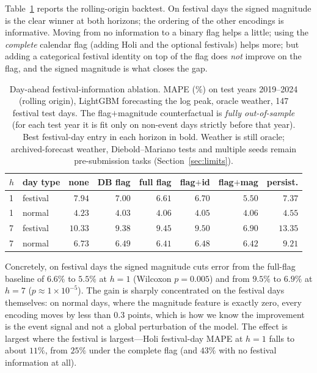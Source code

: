 \documentclass[11pt]{article}
\newcommand{\pct}{\%}
\begin{document}
Table~\ref{tab:ablation} reports the rolling-origin backtest. On festival days the
signed magnitude is the clear winner at both horizons; the ordering of the other
encodings is informative. Moving from no information to a binary flag helps a
little; using the \emph{complete} calendar flag (adding Holi and the optional
festivals) helps more; but adding a categorical festival identity on top of the
flag does \emph{not} improve on the flag, and the signed magnitude is what closes
the gap.

\begin{table}[t]
\centering
\caption{Day-ahead festival-information ablation. MAPE ($\pct$) on test years
2019--2024 (rolling origin), LightGBM forecasting the log peak, oracle weather,
147 festival test days. The flag$+$magnitude counterfactual is \emph{fully
out-of-sample} (for each test year it is fit only on non-event days strictly
before that year). Best festival-day entry in each horizon in bold. Weather is
still oracle; archived-forecast weather, Diebold--Mariano tests and multiple
seeds remain pre-submission tasks (Section~\ref{sec:limits}).}
\label{tab:ablation}
\begin{tabular}{@{}l l r r r r r r@{}}
\toprule
$h$ & day type & none & DB flag & full flag & flag$+$id & flag$+$mag & persist. \\
\midrule
1 & festival & $7.94$ & $7.00$ & $6.61$ & $6.70$ & $\mathbf{5.50}$ & $7.37$ \\
1 & normal   & $4.23$ & $4.03$ & $4.06$ & $4.05$ & $4.06$          & $4.55$ \\
7 & festival & $10.33$& $9.38$ & $9.45$ & $9.50$ & $\mathbf{6.90}$ & $13.35$ \\
7 & normal   & $6.73$ & $6.49$ & $6.41$ & $6.48$ & $6.42$          & $9.21$ \\
\bottomrule
\end{tabular}
\end{table}

Concretely, on festival days the signed magnitude cuts error from the full-flag
baseline of $6.6\pct$ to $5.5\pct$ at $h=1$ (Wilcoxon $p=0.005$) and from
$9.5\pct$ to $6.9\pct$ at $h=7$ ($p\approx1\times10^{-5}$). The gain is sharply
concentrated on the festival days themselves: on normal days, where the magnitude
feature is exactly zero, every encoding moves by less than $0.3$ points, which is
how we know the improvement is the event signal and not a global perturbation of
the model. The effect is largest where the festival is largest---Holi festival-day
MAPE at $h=1$ falls to about $11\pct$, from $25\pct$ under the complete flag (and
$43\pct$ with no festival information at all).
\end{document}

